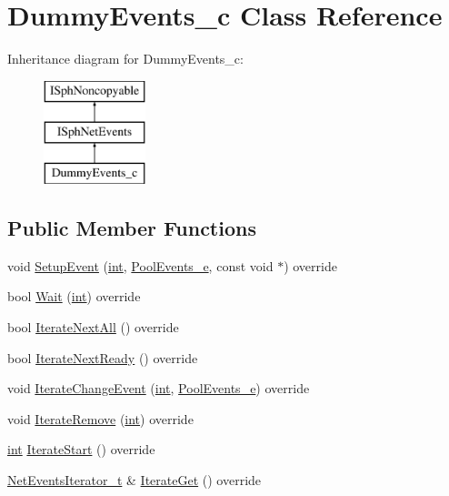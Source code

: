 \hypertarget{classDummyEvents__c}{\section{Dummy\-Events\-\_\-c Class Reference}
\label{classDummyEvents__c}
}
Inheritance diagram for Dummy\-Events\-\_\-c\-:\begin{figure}[H]
\begin{center}
\leavevmode
\includegraphics[height=3.000000cm]{classDummyEvents__c}
\end{center}
\end{figure}
\subsection*{Public Member Functions}
\begin{DoxyCompactItemize}
\item 
void \hyperlink{classDummyEvents__c_aa063d9de47c7c006d85512513fa1b0a1}{Setup\-Event} (\hyperlink{sphinxexpr_8cpp_a4a26e8f9cb8b736e0c4cbf4d16de985e}{int}, \hyperlink{classISphNetEvents_ad9c39d0e92da06a45125b56b7117db2c}{Pool\-Events\-\_\-e}, const void $\ast$) override
\item 
bool \hyperlink{classDummyEvents__c_a580fbec82a63d580b83020af98f7a3a8}{Wait} (\hyperlink{sphinxexpr_8cpp_a4a26e8f9cb8b736e0c4cbf4d16de985e}{int}) override
\item 
bool \hyperlink{classDummyEvents__c_aa93eb30913e3355ffe86548b43fdd835}{Iterate\-Next\-All} () override
\item 
bool \hyperlink{classDummyEvents__c_af96871e1566420643edcff8c12fe07d5}{Iterate\-Next\-Ready} () override
\item 
void \hyperlink{classDummyEvents__c_a366949d99c83b2aac00bc40aba926b94}{Iterate\-Change\-Event} (\hyperlink{sphinxexpr_8cpp_a4a26e8f9cb8b736e0c4cbf4d16de985e}{int}, \hyperlink{classISphNetEvents_ad9c39d0e92da06a45125b56b7117db2c}{Pool\-Events\-\_\-e}) override
\item 
void \hyperlink{classDummyEvents__c_a7ccb6ebd47f7eb993032a69f11230d2a}{Iterate\-Remove} (\hyperlink{sphinxexpr_8cpp_a4a26e8f9cb8b736e0c4cbf4d16de985e}{int}) override
\item 
\hyperlink{sphinxexpr_8cpp_a4a26e8f9cb8b736e0c4cbf4d16de985e}{int} \hyperlink{classDummyEvents__c_a94ffd12b75e25c408e820d4345239b34}{Iterate\-Start} () override
\item 
\hyperlink{structNetEventsIterator__t}{Net\-Events\-Iterator\-\_\-t} \& \hyperlink{classDummyEvents__c_a3b20f364e2735f2864b1af35da699223}{Iterate\-Get} () override
\end{DoxyCompactItemize}
